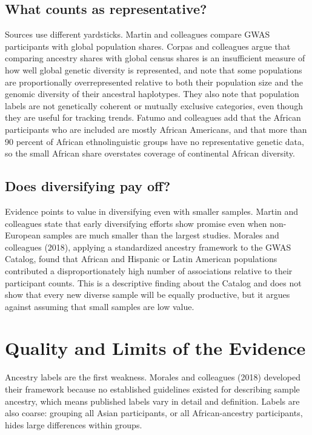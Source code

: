 \documentclass[12pt]{article}
\begin{document}
\subsection*{What counts as representative?}
Sources use different yardsticks. Martin and colleagues compare GWAS participants with global population shares. Corpas and colleagues argue that comparing ancestry shares with global census shares is an insufficient measure of how well global genetic diversity is represented, and note that some populations are proportionally overrepresented relative to both their population size and the genomic diversity of their ancestral haplotypes. They also note that population labels are not genetically coherent or mutually exclusive categories, even though they are useful for tracking trends. Fatumo and colleagues add that the African participants who are included are mostly African Americans, and that more than 90 percent of African ethnolinguistic groups have no representative genetic data, so the small African share overstates coverage of continental African diversity.

\subsection*{Does diversifying pay off?}
Evidence points to value in diversifying even with smaller samples. Martin and colleagues state that early diversifying efforts show promise even when non-European samples are much smaller than the largest studies. Morales and colleagues (2018), applying a standardized ancestry framework to the GWAS Catalog, found that African and Hispanic or Latin American populations contributed a disproportionately high number of associations relative to their participant counts. This is a descriptive finding about the Catalog and does not show that every new diverse sample will be equally productive, but it argues against assuming that small samples are low value.

\section*{Quality and Limits of the Evidence}
Ancestry labels are the first weakness. Morales and colleagues (2018) developed their framework because no established guidelines existed for describing sample ancestry, which means published labels vary in detail and definition. Labels are also coarse: grouping all Asian participants, or all African-ancestry participants, hides large differences within groups.
\end{document}
